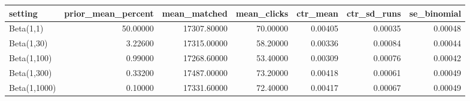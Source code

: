 \begin{tabular}{lrrrrrr}
\toprule
setting & prior\_mean\_percent & mean\_matched & mean\_clicks & ctr\_mean & ctr\_sd\_runs & se\_binomial \\
\midrule
Beta(1,1) & 50.00000 & 17307.80000 & 70.00000 & 0.00405 & 0.00035 & 0.00048 \\
Beta(1,30) & 3.22600 & 17315.00000 & 58.20000 & 0.00336 & 0.00084 & 0.00044 \\
Beta(1,100) & 0.99000 & 17268.60000 & 53.40000 & 0.00309 & 0.00076 & 0.00042 \\
Beta(1,300) & 0.33200 & 17487.00000 & 73.20000 & 0.00418 & 0.00061 & 0.00049 \\
Beta(1,1000) & 0.10000 & 17331.60000 & 72.40000 & 0.00417 & 0.00067 & 0.00049 \\
\bottomrule
\end{tabular}
